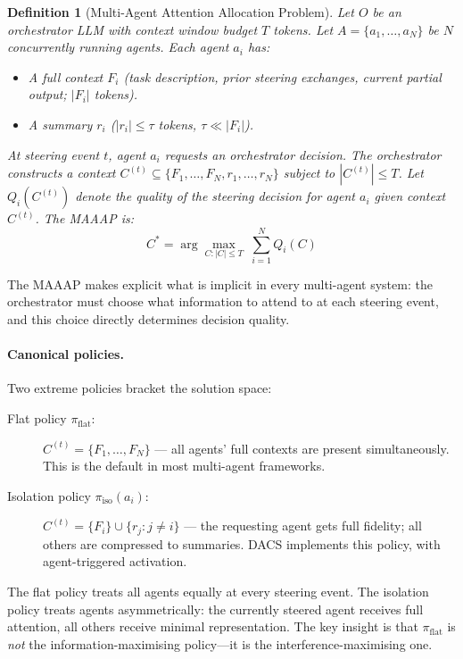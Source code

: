 \documentclass{article}
\newtheorem{definition}{Definition}
\begin{document}
\begin{definition}[Multi-Agent Attention Allocation Problem]
\label{def:maaap}
Let $O$ be an orchestrator LLM with context window budget $T$ tokens.
Let $A = \{a_1, \ldots, a_N\}$ be $N$ concurrently running agents.
Each agent $a_i$ has:
\begin{itemize}
  \item A \emph{full context} $F_i$ (task description, prior steering
  exchanges, current partial output; $|F_i|$ tokens).
  \item A \emph{summary} $r_i$ ($|r_i| \leq \tau$ tokens, $\tau \ll |F_i|$).
\end{itemize}
At steering event $t$, agent $a_i$ requests an orchestrator decision.
The orchestrator constructs a context $C^{(t)} \subseteq
\{F_1, \ldots, F_N, r_1, \ldots, r_N\}$
subject to $|C^{(t)}| \leq T$.
Let $Q_i(C^{(t)})$ denote the quality of the steering decision for agent
$a_i$ given context $C^{(t)}$.
The MAAAP is:
\begin{equation}
  C^* = \arg\max_{C : |C| \leq T} \;\sum_{i=1}^{N} Q_i(C)
  \label{eq:maaap}
\end{equation}
\end{definition}

The MAAAP makes explicit what is implicit in every multi-agent system:
the orchestrator must choose what information to attend to at each
steering event, and this choice directly determines decision quality.

\paragraph{Canonical policies.}
Two extreme policies bracket the solution space:

\begin{description}
  \item[Flat policy $\pi_{\text{flat}}$:]
  $C^{(t)} = \{F_1, \ldots, F_N\}$ --- all agents' full contexts are
  present simultaneously. This is the default in most multi-agent
  frameworks.

  \item[Isolation policy $\pi_{\text{iso}}(a_i)$:]
  $C^{(t)} = \{F_i\} \cup \{r_j : j \neq i\}$ --- the requesting
  agent gets full fidelity; all others are compressed to summaries.
  DACS implements this policy, with agent-triggered activation.
\end{description}

\noindent The flat policy treats all agents equally at every steering
event.
The isolation policy treats agents asymmetrically: the currently
steered agent receives full attention, all others receive minimal
representation.
The key insight is that $\pi_{\text{flat}}$ is \emph{not} the
information-maximising policy---it is the interference-maximising one.
\end{document}
